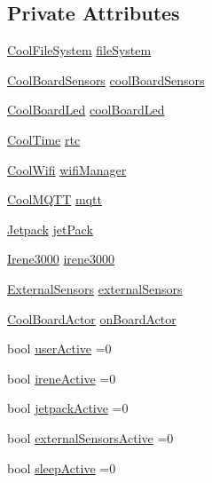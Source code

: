 \subsection*{Private Attributes}
\begin{DoxyCompactItemize}
\item 
\hyperlink{class_cool_file_system}{Cool\+File\+System} \hyperlink{class_cool_board_a42c2586fbb13ff7f06538e9284e8538d}{file\+System}
\item 
\hyperlink{class_cool_board_sensors}{Cool\+Board\+Sensors} \hyperlink{class_cool_board_af102be5288bd7f7a8e59b13f86e26a00}{cool\+Board\+Sensors}
\item 
\hyperlink{class_cool_board_led}{Cool\+Board\+Led} \hyperlink{class_cool_board_a1b1d3c684a5baa56b08486e192fd8e97}{cool\+Board\+Led}
\item 
\hyperlink{class_cool_time}{Cool\+Time} \hyperlink{class_cool_board_a50d2a6716879d64a85f3c6b44ad63275}{rtc}
\item 
\hyperlink{class_cool_wifi}{Cool\+Wifi} \hyperlink{class_cool_board_acd88e6003606b47479ebba81e4aceeca}{wifi\+Manager}
\item 
\hyperlink{class_cool_m_q_t_t}{Cool\+M\+Q\+TT} \hyperlink{class_cool_board_a2399f44d7c23c1149a335cb3b46d90f1}{mqtt}
\item 
\hyperlink{class_jetpack}{Jetpack} \hyperlink{class_cool_board_a30b1357881b01ccbec676856a91e48e9}{jet\+Pack}
\item 
\hyperlink{class_irene3000}{Irene3000} \hyperlink{class_cool_board_ad103718ce316006c4695b8eb312eaf11}{irene3000}
\item 
\hyperlink{class_external_sensors}{External\+Sensors} \hyperlink{class_cool_board_a09e26264839c65873eb56af476eff6b2}{external\+Sensors}
\item 
\hyperlink{class_cool_board_actor}{Cool\+Board\+Actor} \hyperlink{class_cool_board_a4ac693895c21025b8808653f2a4316e6}{on\+Board\+Actor}
\item 
bool \hyperlink{class_cool_board_a6395459131d6889a3005f79c7a35e964}{user\+Active} =0
\item 
bool \hyperlink{class_cool_board_a9c3f7ac625481ee2ae802a25d97a4ae0}{irene\+Active} =0
\item 
bool \hyperlink{class_cool_board_a9be03a913d26e558328935ca3b59a75e}{jetpack\+Active} =0
\item 
bool \hyperlink{class_cool_board_a638b00b76aeb819ecfd4c10b8cdd7bb7}{external\+Sensors\+Active} =0
\item 
bool \hyperlink{class_cool_board_a0a51b2287139f66c738101fb53139230}{sleep\+Active} =0

\end{DoxyCompactItemize}
